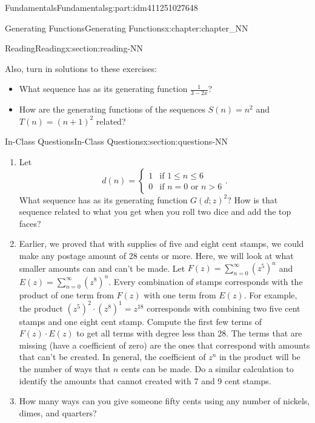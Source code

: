 \documentclass[oneside,10pt,]{book}
\numberwithin{equation}{section}
\newcommand{\gt}{>}
\begin{document}
\begin{partptx}{Fundamentals}{}{Fundamentals}{}{}{g:part:idm411251027648}
\begin{chapterptx}{Generating Functions}{}{Generating Functions}{}{}{x:chapter:chapter_NN}
\begin{sectionptx}{Reading}{}{Reading}{}{}{x:section:reading-NN}
\par
Also, turn in solutions to these exercises:%
\begin{itemize}[label=\textbullet]
\item{}What sequence has as its generating function \(\frac{1}{3-2x}\)?%
\item{}How are the generating functions of the sequences \(S(n)=n^2\) and \(T(n)=(n+1)^2\) related?%
\end{itemize}
%
\end{sectionptx}
%
%
\typeout{************************************************}
\typeout{************************************************}
%
\begin{sectionptx}{In-Class Questions}{}{In-Class Questions}{}{}{x:section:questions-NN}
%
\begin{enumerate}[label=\arabic*.]
\item{}Let%
\begin{equation*}
d(n)=
\begin{cases}
1 & \textrm{if }1 \leq n \leq 6\\
0 & \textrm{if }n=0\textrm{ or }n \gt 6
\end{cases}.
\end{equation*}
What sequence has as its generating function \(G(d;z)^2\)?  How is that sequence related to what you get when you roll two dice and add the top faces?%
\item{}Earlier, we proved that with supplies of five and eight cent stamps, we could make any postage amount of 28 cents or more.  Here, we will look at what smaller amounts can and can't be made.  Let \(F(z)= \sum_{n=0}^{\infty} (z^{5})^n\) and \(E(z)=\sum_{n=0}^{\infty} (z^{8})^n\).  Every combination of stamps corresponds with the product of one term from \(F(z)\) with one term from \(E(z)\).  For example, the product \((z^{5})^{2}\cdot (z^{8})^1= z^{18}\)  corresponds with combining two five cent stamps and one eight cent stamp.  Compute the first few terms of \(F(z)\cdot E(z)\) to  get all terms with degree less than 28. The terms that are missing (have a coefficient of zero) are the ones that correspond with amounts that can't be created.  In general, the coefficient of \(z^n\) in the product will be the number of ways that \(n\) cents can be made. Do a similar calculation to identify the amounts that cannot created with 7 and 9 cent stamps.%
\item{}How many ways can you give someone fifty cents using any number of nickels, dimes, and quarters?%
\end{enumerate}
%
\end{sectionptx}
\end{chapterptx}
\end{partptx}
\end{document}
